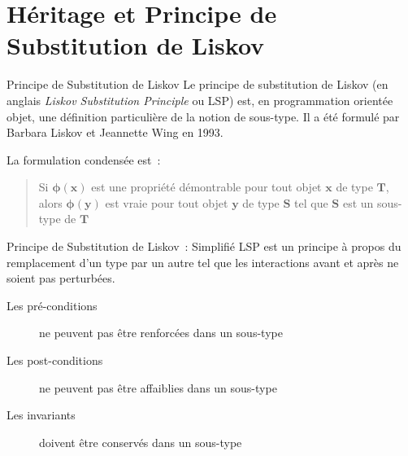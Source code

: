 \documentclass[10pt]{beamer}
\begin{document}
\section{Héritage et Principe de Substitution de Liskov}
\begin{frame}{Principe de Substitution de Liskov}
    Le principe de substitution de Liskov (en anglais \emph{Liskov Substitution Principle} ou \alert{LSP}) est, en programmation orientée objet, une définition particulière de la notion de sous-type. Il a été formulé par Barbara Liskov et Jeannette Wing en 1993. \cite{liskov_behavioral_1994}
    
    La formulation condensée est~:
    \begin{quote}
        Si $\mathbf{\phi(x)}$ est une propriété démontrable pour tout objet $\mathbf{x}$ de type $\mathbf{T}$, alors $\mathbf{\phi(y)}$ est vraie pour tout objet $\mathbf{y}$ de type $\mathbf{S}$ tel que $\mathbf{S}$ est un sous-type de $\mathbf{T}$
        
    \end{quote}
\end{frame}
\begin{frame}{Principe de Substitution de Liskov~: Simplifié}
    LSP est un principe à propos du remplacement d'un type par un autre tel que les interactions avant et après ne soient pas perturbées.

    \begin{description}
        \item[Les pré-conditions] ne peuvent pas être renforcées dans un sous-type
        \item[Les post-conditions] ne peuvent pas être affaiblies dans un sous-type
        \item[Les invariants] doivent être conservés dans un sous-type
    \end{description}
\end{frame}
\end{document}
